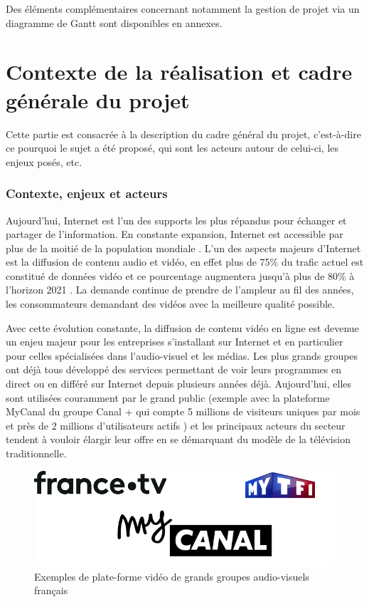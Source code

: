 \documentclass{polytech/polytech}
\begin{document}
Des éléments complémentaires concernant notamment la gestion de projet via un diagramme
de Gantt sont disponibles en annexes.



\part{Contexte de la réalisation et cadre générale du projet}


Cette partie est consacrée à la description du cadre général du projet, c’est-à-dire ce pourquoi le sujet a été proposé, qui sont les acteurs autour de celui-ci, les enjeux posés, etc.


\section{Contexte, enjeux et acteurs}


Aujourd’hui, Internet est l’un des supports les plus répandus pour échanger et partager de l’information. En constante expansion, Internet est accessible par plus de la moitié de la population mondiale \cite{_chiffres_2017}. L’un des aspects majeurs d’Internet est la diffusion de contenu audio et vidéo, en effet plus de 75\% du trafic actuel est constitué de données vidéo et ce pourcentage augmentera jusqu’à plus de 80\% à l’horizon 2021 \cite{_cisco_2017}. La demande continue de prendre de l’ampleur au fil des années, les consommateurs demandant des vidéos avec la meilleure qualité possible.

Avec cette évolution constante, la diffusion de contenu vidéo en ligne est devenue un enjeu majeur pour les entreprises s’installant sur Internet et en particulier pour celles spécialisées dans l’audio-visuel et les médias. Les plus grands groupes ont déjà tous développé des services permettant de voir leurs programmes en direct ou en différé sur Internet depuis plusieurs années déjà. Aujourd’hui, elles sont utilisées couramment par le grand public (exemple avec la plateforme MyCanal du groupe Canal + qui compte 5 millions de visiteurs uniques par mois et près de 2 millions d’utilisateurs actifs \cite{sancerre_canal+_2017}) et les principaux acteurs du secteur tendent à vouloir élargir leur offre en se démarquant du modèle de la télévision traditionnelle.


\begin{figure}
	\includegraphics[scale=0.75]{images/exemple_sites.png}
	\caption{Exemples de plate-forme vidéo de grands groupes audio-visuels français}
	\label{fig:ex_plate-formes}
\end{figure}
\end{document}
